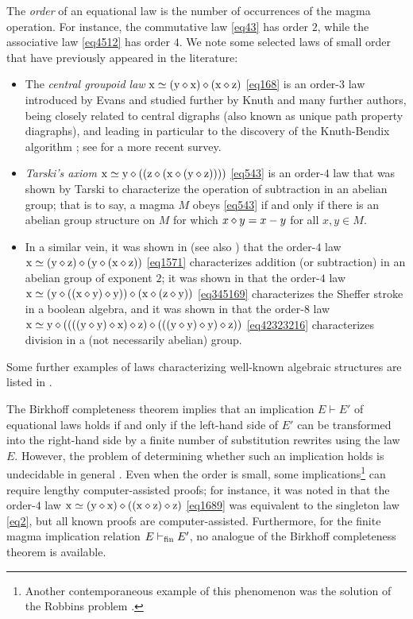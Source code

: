 The \emph{order} of an equational law is the number of occurrences of the magma operation. For instance, the commutative law \eqref{eq43} has order $2$, while the associative law \eqref{eq4512} has order $4$. We note some selected laws of small order that have previously appeared in the literature:
\begin{itemize}
\item The \emph{central groupoid law} $\mathrm{x} \simeq (\mathrm{y} \diamond \mathrm{x}) \diamond (\mathrm{x} \diamond \mathrm{z})$ \eqref{eq168} is an order-$3$ law introduced by Evans \cite{evans} and studied further by Knuth \cite{knuth} and many further authors, being closely related to central digraphs (also known as unique path property diagraphs), and leading in particular to the discovery of the Knuth-Bendix algorithm \cite{knuth-bendix}; see \cite{klt} for a more recent survey.
\item \emph{Tarski's axiom} $\mathrm{x} \simeq \mathrm{y} \diamond ( (\mathrm{z} \diamond (\mathrm{x} \diamond (\mathrm{y} \diamond \mathrm{z}))))$ \eqref{eq543} is an order-$4$ law that was shown by Tarski \cite{Tarski1938} to characterize the operation of subtraction in an abelian group; that is to say, a magma $M$ obeys \eqref{eq543} if and only if there is an abelian group structure on $M$ for which $x \diamond y = x-y$ for all $x,y \in M$.
\item In a similar vein, it was shown in \cite{mendelsohn-padmanabhan} (see also \cite{meredith-prior}) that the order-$4$ law
$\mathrm{x} \simeq (\mathrm{y} \diamond \mathrm{z}) \diamond (\mathrm{y} \diamond (\mathrm{x} \diamond \mathrm{z}))$ \eqref{eq1571} characterizes addition (or subtraction) in an abelian group of exponent $2$; it was shown in \cite{mccune_et_al} that the order-$4$ law $\mathrm{x} \simeq (\mathrm{y} \diamond ((\mathrm{x} \diamond \mathrm{y}) \diamond \mathrm{y})) \diamond (\mathrm{x} \diamond (\mathrm{z} \diamond \mathrm{y}))$ \eqref{eq345169} characterizes the Sheffer stroke in a boolean algebra, and it was shown in \cite{higman-neumann} that the order-$8$ law
$\mathrm{x} \simeq \mathrm{y} \diamond ((((\mathrm{y} \diamond \mathrm{y}) \diamond \mathrm{x}) \diamond \mathrm{z}) \diamond (((\mathrm{y} \diamond \mathrm{y}) \diamond \mathrm{y}) \diamond \mathrm{z}))$ \eqref{eq42323216} characterizes division in a (not necessarily abelian) group.
\end{itemize}
Some further examples of laws characterizing well-known algebraic structures are listed in \cite{mccune-survey}.

The Birkhoff completeness theorem \cite[Th. 3.5.14]{term-rewriting} implies that an implication $E \vdash E'$ of equational laws holds if and only if the left-hand side of $E'$ can be transformed into the right-hand side by a finite number of substitution rewrites using the law $E$. However, the problem of determining whether such an implication holds is undecidable in general \cite{mckenzie}. Even when the order is small, some implications\footnote{Another contemporaneous example of this phenomenon was the solution of the Robbins problem \cite{robbins}.} can require lengthy computer-assisted proofs; for instance, it was noted in \cite{Kisielewicz2} that the order-$4$ law $\mathrm{x} \simeq (\mathrm{y} \diamond \mathrm{x}) \diamond ((\mathrm{x} \diamond \mathrm{z}) \diamond \mathrm{z})$ \eqref{eq1689} was equivalent to the singleton law \eqref{eq2}, but all known proofs are computer-assisted.  Furthermore, for the finite magma implication relation $E \vdash_{\mathrm{fin}} E'$, no analogue of the Birkhoff completeness theorem is available.

